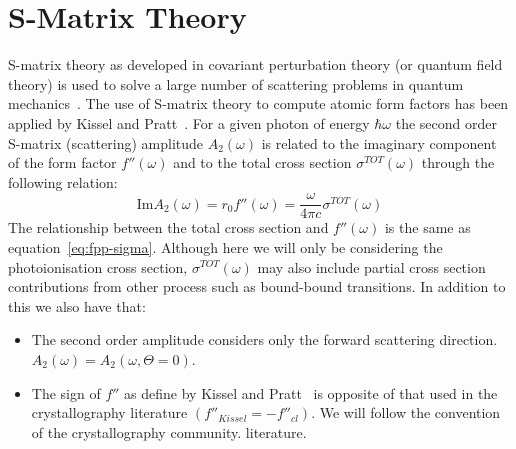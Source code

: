 \section{S-Matrix Theory}
S-matrix theory as developed in covariant perturbation theory (or quantum field
theory) is used to solve a large number of scattering problems in quantum
mechanics~\cite{Sakurai-Advanced,Greiner,Yndurain,Akhiezer,Weinberg}.
The use of S-matrix theory to compute atomic form factors has been applied by
Kissel and Pratt~\cite{Kissel-S-Matrix}.
For a given photon of energy $\hbar \omega$ the second order S-matrix (scattering) 
amplitude $A_2(\omega)$ is related to the imaginary component of the form factor 
$f''(\omega)$ and to the total cross section $\sigma^{TOT}(\omega)$ through the
following relation:
\begin{equation}
    \mathrm{Im} A_2(\omega) = r_0 f''(\omega) = \frac{\omega}{4 \pi c} \sigma^{TOT}(\omega)
\end{equation}
The relationship between the total cross section and $f''(\omega)$ is the same
as equation~\ref{eq:fpp-sigma}. Although here we will only be considering the
photoionisation cross section, $\sigma^{TOT}(\omega)$ may also include partial cross
section contributions from other process such as bound-bound transitions. 
In addition to this we also have that:
\begin{itemize}
    \item The second order amplitude considers only the forward scattering direction.\\
          $A_2(\omega) = A_2(\omega,\Theta=0)$.
    \item The sign of $f''$ as define by Kissel and Pratt~\cite{Kissel-S-Matrix} 
          is opposite of that used in the crystallography literature
          $(f''_{Kissel} = -f''_{cl})$. We will follow the convention of the
          crystallography community.
    literature.
\end{itemize}

